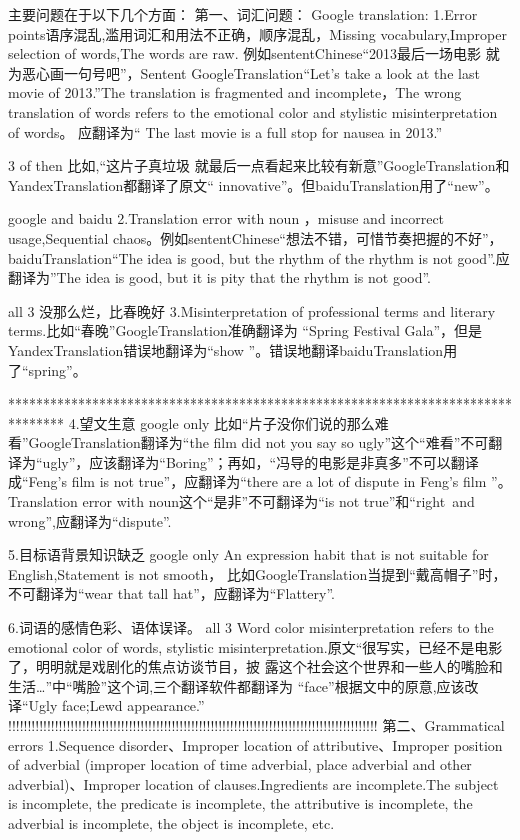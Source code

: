 \documentclass[conference]{IEEEtran}
\begin{document}
\begin{CJK*}{UTF8}{gbsn}
主要问题在于以下几个方面：
第一、词汇问题：
Google translation:
1.Error points语序混乱,滥用词汇和用法不正确，顺序混乱，Missing vocabulary,Improper selection of words,The words are raw.
例如sententChinese“2013最后一场电影 就为恶心画一句号吧”，Sentent
GoogleTranslation“Let's take a look at the last movie of 2013.”The translation
is fragmented and incomplete，The wrong translation of words refers to the
emotional color and stylistic misinterpretation of words。 应翻译为“ The last
movie is a full stop for nausea in 2013.”

3 of then
比如,“这片子真垃圾 就最后一点看起来比较有新意”GoogleTranslation和YandexTranslation都翻译了原文“ innovative”。但baiduTranslation用了“new”。

google and baidu
2.Translation error with noun ，misuse and incorrect usage,Sequential chaos。例如sententChinese“想法不错，可惜节奏把握的不好”，baiduTranslation“The idea is good, but the rhythm of the rhythm is not good”.应翻译为”The idea is good, but it is pity that the rhythm is not good”.


all 3
没那么烂，比春晚好
3.Misinterpretation of professional terms and literary terms.比如“春晚”GoogleTranslation准确翻译为 “Spring Festival Gala”，但是YandexTranslation错误地翻译为“show ”。错误地翻译baiduTranslation用了“spring”。

********************************************************************************
4.望文生意
google only
比如“片子没你们说的那么难看”GoogleTranslation翻译为“the film did not you say so ugly”这个“难看”不可翻译为“ugly”，应该翻译为“Boring”；再如，“冯导的电影是非真多”不可以翻译成“Feng's film is not true”，应翻译为“there are a lot of dispute in Feng's film ”。Translation error with noun这个“是非”不可翻译为“is not true”和“right and wrong”,应翻译为“dispute”.

5.目标语背景知识缺乏
google only
An expression habit that is not suitable for English,Statement is not smooth，
比如GoogleTranslation当提到“戴高帽子”时，不可翻译为“wear that tall hat”，应翻译为“Flattery”.

6.词语的感情色彩、语体误译。
all 3
Word color misinterpretation refers to the emotional color of words, stylistic
misinterpretation.原文“很写实，已经不是电影了，明明就是戏剧化的焦点访谈节目，披
露这个社会这个世界和一些人的嘴脸和生活…”中“嘴脸”这个词,三个翻译软件都翻译为
“face”根据文中的原意,应该改译“Ugly face;Lewd appearance.”
!!!!!!!!!!!!!!!!!!!!!!!!!!!!!!!!!!!!!!!!!!!!!!!!!!!!!!!!!!!!!!!!!!!!!!!!!!!!!!!!!!!!!!!!!!!!!!!
第二、Grammatical errors
1.Sequence disorder、Improper location of attributive、Improper position of adverbial (improper location of time adverbial, place adverbial and other adverbial)、Improper location of clauses.Ingredients are incomplete.The subject is incomplete, the predicate is incomplete, the attributive is incomplete, the adverbial is incomplete, the object is incomplete, etc.


\end{CJK*}
\end{document}
